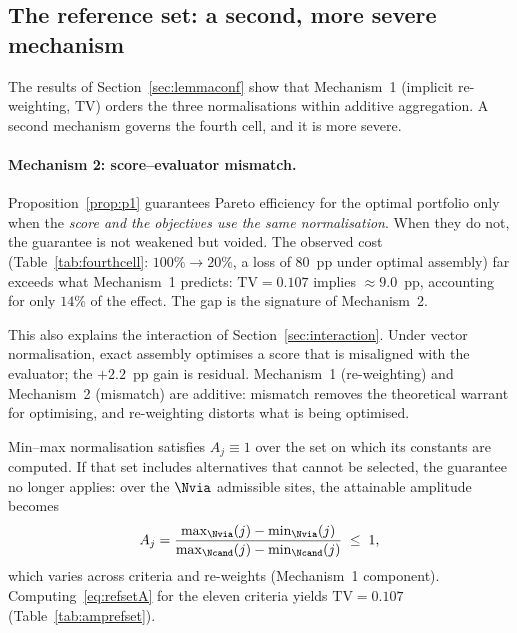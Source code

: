
\subsection{The reference set: a second, more severe mechanism}
\label{sec:refset}

The results of Section~\ref{sec:lemmaconf} show that Mechanism~1
(implicit re-weighting, $\mathrm{TV}$) orders the three normalisations
within additive aggregation.
A second mechanism governs the fourth cell, and it is more severe.

\paragraph{Mechanism 2: score--evaluator mismatch.}
Proposition~\ref{prop:p1} guarantees Pareto efficiency for the optimal
portfolio only when the \emph{score and the objectives use the same
normalisation}.
When they do not, the guarantee is not weakened but voided.
The observed cost (Table~\ref{tab:fourthcell}: $100\%\to20\%$,
a loss of $80$~pp under optimal assembly) far exceeds what
Mechanism~1 predicts: $\mathrm{TV}=0.107$ implies $\approx9.0$~pp,
accounting for only $14\%$ of the effect.
The gap is the signature of Mechanism~2.

This also explains the interaction of Section~\ref{sec:interaction}.
Under vector normalisation, exact assembly optimises a score that is
misaligned with the evaluator; the $+2.2$~pp gain is residual.
Mechanism~1 (re-weighting) and Mechanism~2 (mismatch) are additive:
mismatch removes the theoretical warrant for optimising, and re-weighting
distorts what is being optimised.

Min--max normalisation satisfies $A_j\equiv1$ over the set on which its
constants are computed.
If that set includes alternatives that cannot be selected, the guarantee
no longer applies: over the $\Nvia$ admissible sites, the attainable
amplitude becomes
\begin{equation}
  \label{eq:refsetA}
  A_j = \frac{\max_{\Nvia}(j)-\min_{\Nvia}(j)}
             {\max_{\Ncand}(j)-\min_{\Ncand}(j)} \;\le\; 1,
\end{equation}
which varies across criteria and re-weights (Mechanism~1 component).
Computing~\eqref{eq:refsetA} for the eleven criteria yields
$\mathrm{TV}=0.107$ (Table~\ref{tab:amprefset}).

